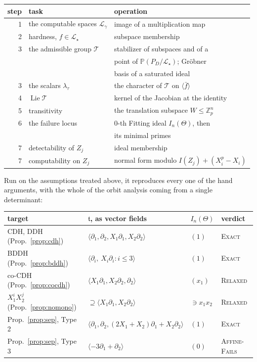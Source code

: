 \documentclass{conjura-solution}
\newcommand{\Zp}{\mathbb{Z}_p}
\newcommand{\LL}{\mathcal{L}}
\newcommand{\Span}[1]{\langle #1 \rangle} %
\newcommand{\Lie}{\operatorname{Lie}}
\newcommand{\tge}{\mathfrak{t}}
\newcommand{\PP}{\mathbb{P}}
\begin{document}
\begin{center}
\small
\begin{tabular}{@{}rll@{}}
\toprule
step & task & operation \\
\midrule
1 & the computable spaces $\LL_\gamma$ & image of a multiplication map \\
2 & hardness, $f\in\LL_\star$ & subspace membership \\
3 & the admissible group $\mathcal T$ & stabilizer of subspaces and of a \\
  & & point of $\PP(P_D/\LL_\star)$; Gr\"obner \\
  & & basis of a saturated ideal \\
3 & the scalars $\lambda_\tau$ & the character of $\mathcal T$ on $\Span{\bar f}$ \\
4 & $\Lie\mathcal T$ & kernel of the Jacobian at the identity \\
5 & transitivity & the translation subspace $W\le\Zp^{n}$ \\
6 & the failure locus & $0$-th Fitting ideal $I_n(\Theta)$, then \\
  & & its minimal primes \\
7 & detectability of $Z_j$ & ideal membership \\
7 & computability on $Z_j$ & normal form modulo
                             $I(Z_j)+(X_i^{p}-X_i)$ \\
\bottomrule
\end{tabular}
\end{center}

\noindent
Run on the assumptions treated above, it reproduces every one of the hand arguments, with the
whole of the orbit analysis coming from a single determinant:

\begin{center}
\footnotesize
\setlength{\tabcolsep}{4.5pt}
\begin{tabular}{@{}llll@{}}
\toprule
target & $\tge$, as vector fields & $I_n(\Theta)$ & verdict \\
\midrule
CDH, DDH (Prop.~\ref{prop:cdh})
  & $\Span{\partial_1,\partial_2,X_1\partial_1,X_2\partial_2}$
  & $(1)$ & \textsc{Exact} \\
BDDH (Prop.~\ref{prop:bddh})
  & $\Span{\partial_i,\ X_i\partial_i:i\le 3}$
  & $(1)$ & \textsc{Exact} \\
co-CDH (Prop.~\ref{prop:cocdh})
  & $\Span{X_1\partial_1,X_2\partial_2,\partial_2}$
  & $(x_1)$ & \textsc{Relaxed} \\
$X_1^{i}X_2^{j}$ (Prop.~\ref{prop:nomono})
  & $\supseteq\Span{X_1\partial_1,X_2\partial_2}$
  & $\ni x_1x_2$ & \textsc{Relaxed} \\
Prop.~\ref{prop:sep}, Type 2
  & $\Span{\partial_1,\partial_2,(2X_1{+}X_2)\partial_1+X_2\partial_2}$
  & $(1)$ & \textsc{Exact} \\
Prop.~\ref{prop:sep}, Type 3
  & $\Span{-3\partial_1+\partial_2}$
  & $(0)$ & \textsc{Affine-Fails} \\
\bottomrule
\end{tabular}
\end{center}
\end{document}

